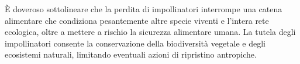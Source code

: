 \documentclass[main.tex]{subfiles}
\begin{document}
È doveroso sottolineare che la perdita di impollinatori interrompe una catena alimentare che condiziona pesantemente altre specie viventi e l’intera rete ecologica, oltre a mettere a rischio la sicurezza alimentare umana. La tutela degli impollinatori consente la conservazione della biodiversità vegetale e degli ecosistemi naturali, limitando eventuali azioni di ripristino antropiche.
\end{document}
